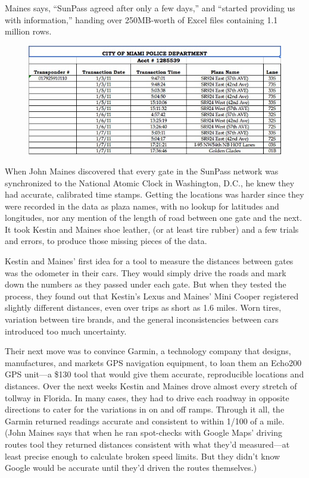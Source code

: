 Maines says, ``SunPass agreed after only a few days,'' and ``started providing
us with information,'' handing over 250MB-worth of Excel files containing
1.1 million rows.
    \begin{figure}
    \includegraphics{images/SunSentinalShapeOfData.jpg}
    \end{figure}

When John Maines discovered that every gate in the SunPass network was
synchronized to the National Atomic Clock in Washington, D.C., he knew
they had accurate, calibrated time stamps. Getting the locations was harder
since they were recorded in the data as plaza names, with no lookup for
latitudes and longitudes, nor any mention of the length of road between one gate and the next. It took Kestin and Maines shoe leather, (or at least
tire rubber) and a few trials and errors, to produce those missing pieces of
the data.

Kestin and Maines' first idea for a tool to measure the distances between
gates was the odometer in their cars. They would simply drive the roads
and mark down the numbers as they passed under each gate. But when they
tested the process, they found out that Kestin's Lexus and Maines' Mini
Cooper registered slightly different distances, even over trips as short as 1.6
miles. Worn tires, variation between tire brands, and the general inconsistencies
between cars introduced too much uncertainty.

Their next move was to convince Garmin, a technology company that
designs, manufactures, and markets GPS navigation equipment, to loan
them an Echo200 GPS unit—a \$130 tool that would give them accurate,
reproducible locations and distances. Over the next weeks Kestin and
Maines drove almost every stretch of tollway in Florida. In many cases, they
had to drive each roadway in opposite directions to cater for the variations
in on and off ramps. Through it all, the Garmin returned readings accurate
and consistent to within 1/100 of a mile. (John Maines says that when he ran
spot-checks with Google Maps' driving routes tool they returned distances
consistent with what they'd measured—at least precise enough to calculate
broken speed limits. But they didn't know Google would be accurate until
they'd driven the routes themselves.)

